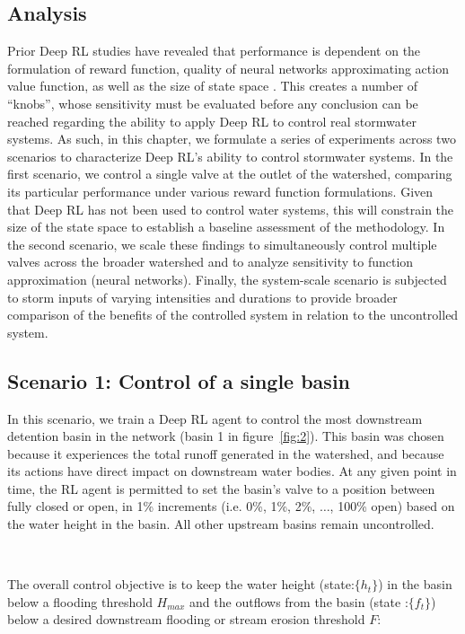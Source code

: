 \subsection{Analysis}
Prior Deep RL studies have revealed that performance is dependent on the formulation of reward function, quality of neural networks approximating action value function, as well as the size of state space \cite{Sutton98, henderson2017Deep}.
This creates a number of ``knobs'', whose sensitivity must be evaluated before any conclusion can be reached regarding the ability to apply Deep RL to control real stormwater systems.
As such, in this chapter, we formulate a series of experiments across two scenarios to characterize Deep RL’s ability to control stormwater systems.
In the first scenario, we control a single valve at the outlet of the watershed, comparing its particular performance under various reward function formulations.
Given that Deep RL has not been used to control water systems, this will constrain the size of the state space to establish a baseline assessment of the methodology.
In the second scenario, we scale these findings to simultaneously control multiple valves across the broader watershed and to analyze  sensitivity to function approximation (neural networks). Finally, the system-scale scenario is subjected to storm inputs of varying intensities and durations to provide broader comparison of the benefits of the controlled system in relation to the uncontrolled system.

\subsection{Scenario 1: Control of a single basin}
In this scenario, we train a Deep RL agent to control the most downstream detention basin in the network (basin 1 in figure~\ref{fig:2}).
This basin was chosen because it experiences the total runoff generated in the watershed, and because its actions have direct impact on downstream water bodies.
At any given point in time, the RL agent is permitted to set the basin’s valve to a position between fully closed or open, in 1\% increments (i.e. 0\%, 1\%, 2\%, $\ldots$, 100\% open) based on the water height in the basin. All other upstream basins remain uncontrolled.

\

The overall control objective is to keep the water height (state:$\{h_t\}$) in the basin below a flooding threshold $H_{max}$ and the outflows from the basin (state :$\{f_t\}$) below a desired downstream flooding or stream erosion threshold $F$:

